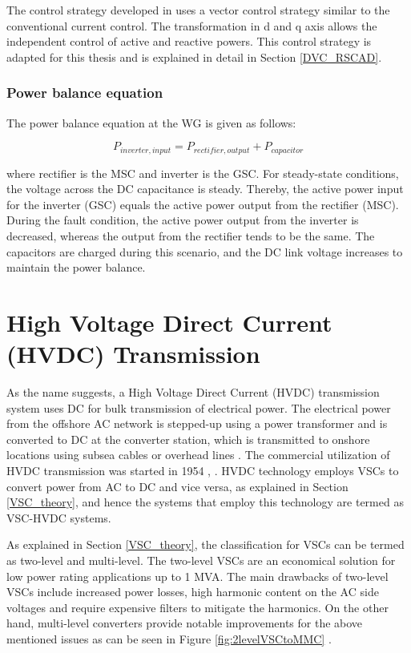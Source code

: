 The control strategy developed in \cite{korai_dynamic_2019} uses a vector control strategy similar to the conventional current control. The transformation in d and q axis allows the independent control of active and reactive powers. This control strategy is adapted for this thesis and is explained in detail in Section \ref{DVC_RSCAD}. 

\subsubsection{Power balance equation}
The power balance equation at the \gls{WG} is given as follows:

\begin{equation}\label{powbaleq}
    P_{inverter,input} = P_{rectifier,output} + P_{capacitor}  
\end{equation}

where rectifier is the \gls{MSC} and inverter is the \gls{GSC}. For steady-state conditions, the voltage across the \gls{DC} capacitance is steady. Thereby, the active power input for the inverter (\gls{GSC}) equals the active power output from the rectifier (\gls{MSC}). During the fault condition, the active power output from the inverter is decreased, whereas the output from the rectifier tends to be the same. The capacitors are charged during this scenario, and the \gls{DC} link voltage increases to maintain the power balance. 

\section{High Voltage Direct Current (HVDC) Transmission}\label{HVDC_trans_theory}
As the name suggests, a High Voltage Direct Current (\gls{HVDC}) transmission system uses \gls{DC} for bulk transmission of electrical power. The electrical power from the offshore \gls{AC} network is stepped-up using a power transformer and is converted to \gls{DC} at the converter station, which is transmitted to onshore locations using subsea cables or overhead lines \cite{abbreviewnew}. The commercial utilization of \gls{HVDC} transmission was started in 1954 \cite{cigre2005b4}, \cite{peake_history_2010}. \gls{HVDC} technology employs \gls{VSC}s to convert power from \gls{AC} to \gls{DC} and vice versa, as explained in Section \ref{VSC_theory}, and hence the systems that employ this technology are termed as \gls{VSC}-\gls{HVDC} systems.

As explained in Section \ref{VSC_theory}, the classification for \gls{VSC}s can be termed as two-level and multi-level. The two-level \gls{VSC}s are an economical solution for low power rating applications up to 1 MVA. The main drawbacks of two-level \gls{VSC}s include increased power losses, high harmonic content on the \gls{AC} side voltages and require expensive filters to mitigate the harmonics. On the other hand, multi-level converters provide notable improvements for the above mentioned issues as can be seen in Figure \ref{fig:2levelVSCtoMMC} \cite{sharifabadi2016design}.   

